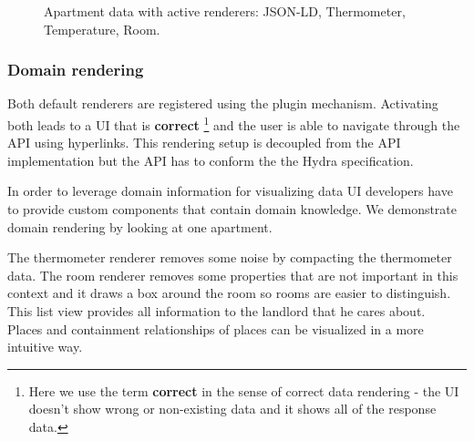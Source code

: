 \begin{figure}[!htb]
  \caption{Apartment data with active renderers: JSON-LD, Thermometer, Temperature, Room.}
\end{figure}

\subsubsection{Domain rendering}
Both default renderers are registered using the plugin mechanism. Activating both leads to a UI that is \textbf{correct} \footnote{Here we use the term \textbf{correct} in the sense of correct data rendering - the UI doesn't show wrong or non-existing data and it shows all of the response data.} and the user is able to navigate through the API using hyperlinks. This rendering setup is decoupled from the API implementation but the API has to conform the the Hydra specification.

In order to leverage domain information for visualizing data UI developers have to provide custom components that contain domain knowledge. We demonstrate domain rendering by looking at one apartment.

The thermometer renderer removes some noise by compacting the thermometer data. The room renderer removes some properties that are not important in this context and it draws a box around the room so rooms are easier to distinguish. This list view provides all information to the landlord that he cares about. \\
Places and containment relationships of places can be visualized in a more intuitive way.

